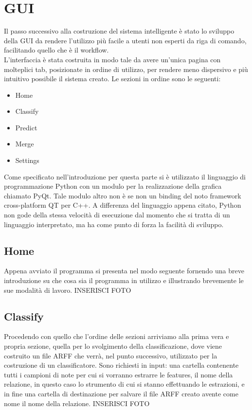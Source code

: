 \chapter{GUI}
Il passo successivo alla costruzione del sistema intelligente è stato lo sviluppo della GUI da rendere l'utilizzo più facile a utenti non esperti da riga di comando, facilitando quello che è il workflow.\\
L'interfaccia è stata costruita in modo tale da avere un'unica pagina con molteplici tab, posizionate in ordine di utilizzo, per rendere meno dispersivo e più intuitivo possibile il sistema creato. Le sezioni in ordine sono le seguenti:
\begin{itemize}
	\item Home
	\item Classify
	\item Predict
	\item Merge
	\item Settings
\end{itemize}

Come specificato nell'introduzione per questa parte si è utilizzato il linguaggio di programmazione Python con un modulo per la realizzazione della grafica chiamato PyQt. Tale modulo altro non è se non un binding del noto framework cross-platform QT per C++. A differenza del linguaggio appena citato, Python non gode della stessa velocità di esecuzione dal momento che si tratta di un linguaggio interpretato, ma ha come punto di forza la facilità di sviluppo.

\section{Home}
Appena avviato il programma si presenta nel modo seguente fornendo una breve introduzione su che cosa sia il programma in utilizzo e illustrando brevemente le sue modalità di lavoro.
INSERISCI FOTO 

\section{Classify}
Procedendo con quello che l'ordine delle sezioni arriviamo alla prima vera e propria sezione, quella per lo svolgimento della classificazione, dove viene costruito un file ARFF che verrà, nel punto successivo, utilizzato per la costruzione di un classificatore. Sono richiesti in input: una cartella contenente tutti i campioni di note per cui si vorranno estrarre le features, il nome della relazione, in questo caso lo strumento di cui si stanno effettuando le estrazioni, e in fine una cartella di destinazione per salvare il file ARFF creato avente come nome il nome della relazione.
INSERISCI FOTO

